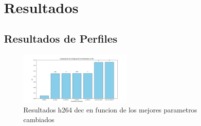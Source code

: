 \documentclass[conference]{IEEEtran}
\begin{document}
\section{Resultados}

\subsection{Resultados de Perfiles}

\begin{figure}[htbp]
\centering
\includegraphics[width=0.5\textwidth]{Barras_IPC_1.png}
\caption{Resultados h264 dec en funcion de los mejores parametros cambiados}
\label{fig:example}
\end{figure}
\end{document}
